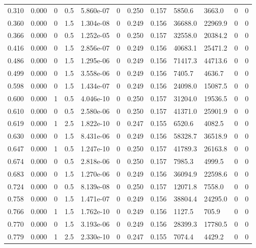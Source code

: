 \documentclass[preview]{standalone}
\begin{document}
{{\begin{tabular}{L{1.2cm}C{1.2cm} C{0.3cm}C{0.5cm} C{1.4cm}C{1.4cm} C{1.4cm}C{1.4cm} C{1.6cm}C{1.6cm} C{1.6cm}C{1.6cm}}
  0.310  &  0.000  & 0     & 0.5 &  5.860e-07  & 0  &  0.250&   0.157& 5850.6 & 3663.0   &  0 & 0  \\ 
  0.360  &  0.000  & 0     & 1.5 &  1.304e-08  & 0  &  0.249&   0.156& 36688.0 & 22969.9   &  0 & 0  \\ 
  0.366  &  0.000  & 0     & 0.5 &  1.252e-05  & 0  &  0.250&   0.157& 32558.0 & 20384.2   &  0 & 0  \\ 
  0.416  &  0.000  & 0     & 1.5 &  2.856e-07  & 0  &  0.249&   0.156& 40683.1 & 25471.2   &  0 & 0  \\ 
  0.486  &  0.000  & 0     & 1.5 &  1.295e-06  & 0  &  0.249&   0.156& 71417.3 & 44713.6   &  0 & 0  \\ 
  0.499  &  0.000  & 0     & 1.5 &  3.558e-06  & 0  &  0.249&   0.156& 7405.7 & 4636.7   &  0 & 0  \\ 
  0.598  &  0.000  & 0     & 1.5 &  1.434e-07  & 0  &  0.249&   0.156& 24098.0 & 15087.5   &  0 & 0  \\ 
  0.600  &  0.000  & 1     & 0.5 &  4.046e-10  & 0  &  0.250&   0.157& 31204.0 & 19536.5   &  0 & 0  \\ 
  0.610  &  0.000  & 0     & 0.5 &  2.580e-06  & 0  &  0.250&   0.157& 41371.0 & 25901.9   &  0 & 0  \\ 
  0.619  &  0.000  & 1     & 2.5 &  1.822e-10  & 0  &  0.247&   0.155& 6520.6 & 4082.5   &  0 & 0  \\ 
  0.630  &  0.000  & 0     & 1.5 &  8.431e-06  & 0  &  0.249&   0.156& 58328.7 & 36518.9   &  0 & 0  \\ 
  0.647  &  0.000  & 1     & 0.5 &  1.247e-10  & 0  &  0.250&   0.157& 41789.3 & 26163.8   &  0 & 0  \\ 
  0.674  &  0.000  & 0     & 0.5 &  2.818e-06  & 0  &  0.250&   0.157& 7985.3 & 4999.5   &  0 & 0  \\ 
  0.683  &  0.000  & 0     & 1.5 &  1.270e-06  & 0  &  0.249&   0.156& 36094.9 & 22598.6   &  0 & 0  \\ 
  0.724  &  0.000  & 0     & 0.5 &  8.139e-08  & 0  &  0.250&   0.157& 12071.8 & 7558.0   &  0 & 0  \\ 
  0.758  &  0.000  & 0     & 1.5 &  1.471e-07  & 0  &  0.249&   0.156& 38804.4 & 24295.0   &  0 & 0  \\ 
  0.766  &  0.000  & 1     & 1.5 &  1.762e-10  & 0  &  0.249&   0.156& 1127.5 & 705.9   &  0 & 0  \\ 
  0.770  &  0.000  & 0     & 1.5 &  3.193e-06  & 0  &  0.249&   0.156& 28399.3 & 17780.5   &  0 & 0  \\ 
  0.779  &  0.000  & 1     & 2.5 &  2.330e-10  & 0  &  0.247&   0.155& 7074.4 & 4429.2   &  0 & 0  \\ 

\end{tabular}}}
\end{document}
